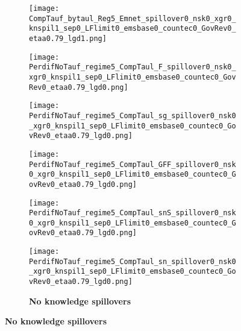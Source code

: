 \clearpage
\thispagestyle{empty}
 \begin{figure}[h!!]
	\centering
	\caption{Effect of a constant carbon tax in model variations }\label{fig:Leveltauf_nsk0_xgr0_noknow}	
	\begin{subfigure}{0.75\textwidth}
		\caption{\textbf{No knowledge spillovers}}
	\begin{minipage}[]{0.32\textwidth}
	\texttt{[image: CompTauf\_bytaul\_Reg5\_Emnet\_spillover0\_nsk0\_xgr0\_knspil1\_sep0\_LFlimit0\_emsbase0\_countec0\_GovRev0\_etaa0.79\_lgd1.png]}
\end{minipage}	
\begin{minipage}[]{0.32\textwidth}
	\texttt{[image: PerdifNoTauf\_regime5\_CompTaul\_F\_spillover0\_nsk0\_xgr0\_knspil1\_sep0\_LFlimit0\_emsbase0\_countec0\_GovRev0\_etaa0.79\_lgd0.png]}
\end{minipage}
\begin{minipage}[]{0.32\textwidth}
\texttt{[image: PerdifNoTauf\_regime5\_CompTaul\_sg\_spillover0\_nsk0\_xgr0\_knspil1\_sep0\_LFlimit0\_emsbase0\_countec0\_GovRev0\_etaa0.79\_lgd0.png]}
\end{minipage}
\begin{minipage}[]{0.32\textwidth}
	\texttt{[image: PerdifNoTauf\_regime5\_CompTaul\_GFF\_spillover0\_nsk0\_xgr0\_knspil1\_sep0\_LFlimit0\_emsbase0\_countec0\_GovRev0\_etaa0.79\_lgd0.png]}
\end{minipage}
\begin{minipage}[]{0.32\textwidth}
\texttt{[image: PerdifNoTauf\_regime5\_CompTaul\_snS\_spillover0\_nsk0\_xgr0\_knspil1\_sep0\_LFlimit0\_emsbase0\_countec0\_GovRev0\_etaa0.79\_lgd0.png]}
\end{minipage}
\begin{minipage}[]{0.32\textwidth}
\texttt{[image: PerdifNoTauf\_regime5\_CompTaul\_sn\_spillover0\_nsk0\_xgr0\_knspil1\_sep0\_LFlimit0\_emsbase0\_countec0\_GovRev0\_etaa0.79\_lgd0.png]}
\end{minipage}
	\end{subfigure}


\end{figure}
